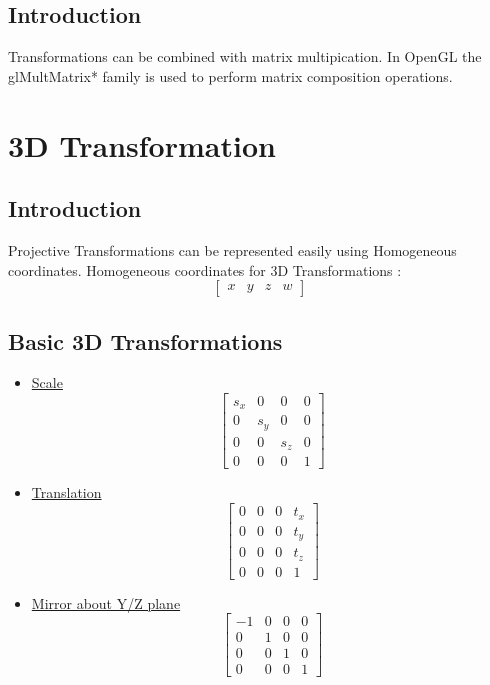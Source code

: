 \documentclass[a4paper,12pt,titlepage,twosided]{article}
\begin{document}
	\subsection{Introduction}
	Transformations can be combined with matrix multipication. In OpenGL the glMultMatrix* family is used to perform matrix composition operations.
\section{3D Transformation}
	\subsection{Introduction}
	Projective Transformations can be represented easily using Homogeneous coordinates. Homogeneous coordinates for 3D Transformations :
	\begin{equation}
		\begin{bmatrix}
		x & y & z & w
		\end{bmatrix}
	\label{Homogeneous Coordinates}
	\end{equation}
	\subsection{Basic 3D Transformations}
	\begin{itemize}
	\item	\underline{Scale} \\
		\begin{equation}
			\begin{bmatrix}
			s_{x} & 0 & 0 & 0 \\
			0 & s_{y} & 0 & 0 \\
			0 & 0 & s_{z} & 0 \\
			0 & 0 & 0 & 1
			\end{bmatrix}
		\end{equation}
	\item	\underline{Translation} \\
		\begin{equation}
			\begin{bmatrix}
			0 & 0 & 0 & t_{x} \\
			0 & 0 & 0 & t_{y} \\
			0 & 0 & 0 & t_{z} \\
			0 & 0 & 0 & 1
			\end{bmatrix}
		\end{equation}
	\item	\underline{Mirror about Y/Z plane} \\
		\begin{equation}
			\begin{bmatrix}
			-1 & 0 & 0 & 0 \\
			0 & 1 & 0 & 0 \\
			0 & 0 & 1 & 0 \\
			0 & 0 & 0 & 1
			\end{bmatrix}
		\end{equation}
	\end{itemize}
	\pagebreak
\end{document}
